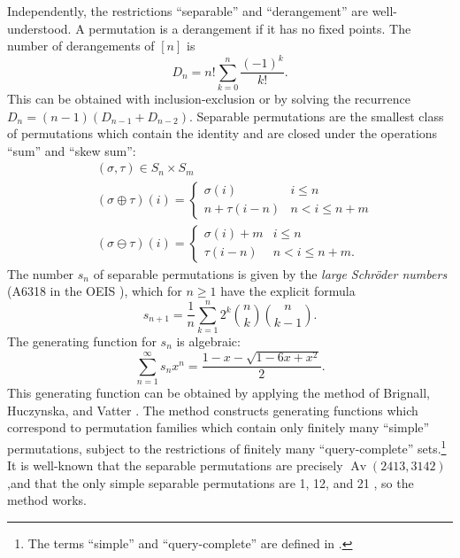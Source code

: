 \documentclass{article}
\DeclareMathOperator{\Av}{Av}
\theoremstyle{plain}
\theoremstyle{definition}
\theoremstyle{plain}
\begin{document}
Independently, the restrictions ``separable'' and ``derangement'' are
well-understood. A permutation is a derangement if it has no fixed points. The
number of derangements of $[n]$ is
\begin{equation*}
    D_n = n! \sum_{k = 0}^n \frac{(-1)^k}{k!}.
\end{equation*}
This can be obtained with inclusion-exclusion or by solving the recurrence $D_n
= (n - 1) (D_{n - 1} + D_{n - 2})$. Separable permutations are the smallest
class of permutations which contain the identity and are closed under the
operations ``sum'' and ``skew sum'':
\begin{align*}
    &(\sigma, \tau) \in S_n \times S_m \\
    &(\sigma \oplus \tau)(i) =
    \begin{cases}
        \sigma(i) & i \leq n \\
        n + \tau(i - n) & n < i \leq n + m
    \end{cases} \\
    &(\sigma \ominus \tau)(i) =
    \begin{cases}
        \sigma(i) + m & i \leq n \\
        \tau(i - n) & n < i \leq n + m.
    \end{cases}
\end{align*}
The number $s_n$ of separable permutations is given by the \emph{large
Schr\"oder numbers} (A6318 in the OEIS \cite{OEISA6318}), which for $n \geq 1$
have the explicit formula
\begin{equation*}
    s_{n + 1} = \frac{1}{n} \sum_{k = 1}^n 2^k {n \choose k} {n \choose k - 1}.
\end{equation*}
The generating function for $s_n$ is algebraic:
\begin{equation*}
    \sum_{n = 1}^\infty s_n x^n = \frac{1 - x - \sqrt{1 - 6x + x^2}}{2}.
\end{equation*}
This generating function can be obtained by applying the method of Brignall,
Huczynska, and Vatter \cite{BrignallHuczynskaVatter2008}. The method constructs
generating functions which correspond to permutation families which
contain only finitely many ``simple'' permutations, subject to the restrictions
of finitely many ``query-complete'' sets.\footnote{The terms ``simple'' and
``query-complete'' are defined in \cite{BrignallHuczynskaVatter2008}.} It is
well-known that the separable permutations are precisely $\Av(2413,
3142)$,\footnotemark and that the only simple separable permutations are 1, 12,
and 21 \cite{West1995,BoseBussLubiw1998}, so the method works.
\end{document}
